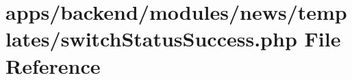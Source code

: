 \hypertarget{news_2templates_2switch_status_success_8php}{\section{apps/backend/modules/news/templates/switch\-Status\-Success.php File Reference}
\label{news_2templates_2switch_status_success_8php}
}
